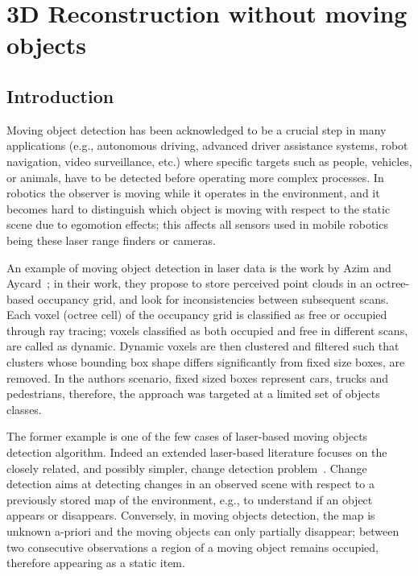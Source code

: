\chapter{3D Reconstruction without moving objects}

\section{Introduction}
\label{sec:intro}
Moving object detection has been acknowledged to be a crucial step in many applications (e.g., autonomous driving, advanced driver assistance systems, robot navigation, video surveillance, etc.) where specific targets such as  people, vehicles, or animals, have to be detected before operating more complex processes.
In robotics the observer is moving while it operates in the environment, and it becomes hard to distinguish which object is moving with respect to the static scene due to egomotion effects; this affects all sensors used in mobile robotics being these laser range finders or cameras.


An example of moving object detection in laser data is the work by Azim and Aycard~\cite{azim2012detection}; in their work, they propose to store perceived point clouds in an octree-based occupancy grid, and look for inconsistencies between subsequent scans. Each voxel (octree cell) of the occupancy grid is classified as free or occupied through ray tracing; voxels classified as both occupied and free in different scans, are called as dynamic. 
Dynamic voxels are then clustered and filtered such that clusters whose bounding box shape differs significantly from fixed size boxes, are removed. In the authors scenario, fixed sized boxes represent cars, trucks and pedestrians, therefore, the approach was targeted at a limited set of objects classes.

The former example is one of the few cases of laser-based moving objects detection algorithm. Indeed an extended laser-based literature focuses on the closely related, and possibly simpler, change detection problem~\cite{vieira2014spatial,andreasson2007has,drews2013fast,xiao2013change}. %
Change detection  aims at detecting changes in an observed scene with respect to a previously stored map of the environment, e.g., to understand if an object appears or disappears. 
Conversely, in moving objects detection, the map is unknown a-priori and the moving objects can only partially disappear; between two consecutive observations a region of a moving object remains occupied, therefore appearing as a static item.
%
%

